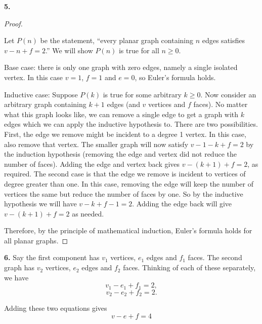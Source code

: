 \documentclass[10pt,]{book}
\theoremstyle{plain}
\theoremstyle{definition}
\theoremstyle{definition}
\theoremstyle{definition}
\numberwithin{equation}{chapter}
\begin{document}
\noindent\textbf{5.}\quad{}\begin{proof}\hypertarget{proof-58}{}

Let \(P(n)\) be the statement, ``every planar graph containing \(n\) edges satisfies \(v - n + f = 2\).'' We will show \(P(n)\) is true for all \(n \ge 0\).

			Base case: there is only one graph with zero edges, namely a single isolated vertex. In this case \(v = 1\), \(f = 1\) and \(e = 0\), so Euler's formula holds.

			Inductive case: Suppose \(P(k)\) is true for some arbitrary \(k \ge 0\). Now consider an arbitrary graph containing \(k+1\) edges (and \(v\) vertices and \(f\) faces). No matter what this graph looks like, we can remove a single edge to get a graph with \(k\) edges which we can apply the inductive hypothesis to. There are two possibilities. First, the edge we remove might be incident to a degree 1 vertex. In this case, also remove that vertex. The smaller graph will now satisfy \(v-1 - k + f = 2\) by the induction hypothesis (removing the edge and vertex did not reduce the number of faces). Adding the edge and vertex back gives \(v - (k+1) + f = 2\), as required. The second case is that the edge we remove is incident to vertices of degree greater than one. In this case, removing the edge will keep the number of vertices the same but reduce the number of faces by one. So by the inductive hypothesis we will have \(v - k + f-1 = 2\). Adding the edge back will give \(v - (k+1) + f = 2\) as needed.

			Therefore, by the principle of mathematical induction, Euler's formula holds for all planar graphs.
%
\end{proof}
\par\smallskip
\noindent\textbf{6.}\quad{}
Say the first component has \(v_1\) vertices, \(e_1\) edges and \(f_1\) faces. The second graph has \(v_2\) vertices, \(e_2\) edges and \(f_2\) faces. Thinking of each of these separately, we have
\begin{equation*}
  v_1 - e_1 + f_1 = 2,
\end{equation*}
%
\begin{equation*}
  v_2 - e_2 + f_2 = 2.
\end{equation*}\par

Adding these two equations gives
\begin{equation*}
  v - e + f = 4
\end{equation*}
%
\par
\end{document}
